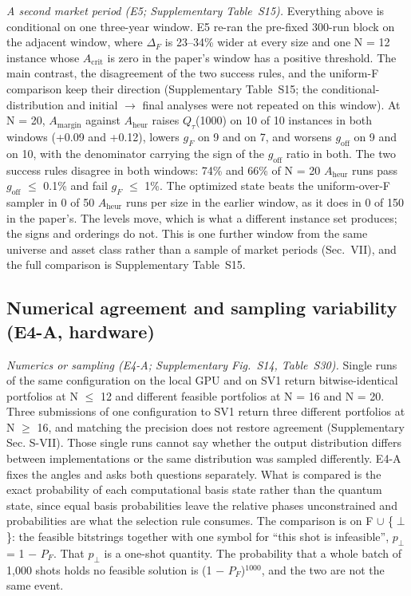 \documentclass[journal]{IEEEtran}
\begin{document}
\textit{A second market period (E5; Supplementary Table~S15).} Everything above is conditional on one three-year window. E5 re-ran the pre-fixed 300-run block on the adjacent window, where $\Delta_{F}$ is 23--34\% wider at every size and one N = 12 instance whose $A_{\mathrm{crit}}$ is zero in the paper's window has a positive threshold. The main contrast, the disagreement of the two success rules, and the uniform-F comparison keep their direction (Supplementary Table~S15; the conditional-distribution and initial $\rightarrow$ final analyses were not repeated on this window). At N = 20, $A_{\mathrm{margin}}$ against $A_{\mathrm{heur}}$ raises $Q_{\tau}$(1000) on 10 of 10 instances in both windows (+0.09 and +0.12), lowers $g_{F}$ on 9 and on 7, and worsens $g_{\mathrm{off}}$ on 9 and on 10, with the denominator carrying the sign of the $g_{\mathrm{off}}$ ratio in both. The two success rules disagree in both windows: 74\% and 66\% of N = 20 $A_{\mathrm{heur}}$ runs pass $g_{\mathrm{off}}$ $\leq$ 0.1\% and fail $g_{F}$ $\leq$ 1\%. The optimized state beats the uniform-over-F sampler in 0 of 50 $A_{\mathrm{heur}}$ runs per size in the earlier window, as it does in 0 of 150 in the paper's. The levels move, which is what a different instance set produces; the signs and orderings do not. This is one further window from the same universe and asset class rather than a sample of market periods (Sec.~VII), and the full comparison is Supplementary Table~S15.


\subsection{Numerical agreement and sampling variability (E4-A, hardware)}


\textit{Numerics or sampling (E4-A; Supplementary Fig.~S14, Table~S30).} Single runs of the same configuration on the local GPU and on SV1 return bitwise-identical portfolios at N $\leq$ 12 and different feasible portfolios at N = 16 and N = 20. Three submissions of one configuration to SV1 return three different portfolios at N $\geq$ 16, and matching the precision does not restore agreement (Supplementary Sec. S-VII). Those single runs cannot say whether the output distribution differs between implementations or the same distribution was sampled differently. E4-A fixes the angles and asks both questions separately. What is compared is the exact probability of each computational basis state rather than the quantum state, since equal basis probabilities leave the relative phases unconstrained and probabilities are what the selection rule consumes. The comparison is on F $\cup$ \{$\perp$\}: the feasible bitstrings together with one symbol for ``this shot is infeasible'', $p_{\perp}$ = 1 $-$ $P_{F}$. That $p_{\perp}$ is a one-shot quantity. The probability that a whole batch of 1,000 shots holds no feasible solution is (1 $-$ $P_{F}$)$^{1000}$, and the two are not the same event.
\end{document}
